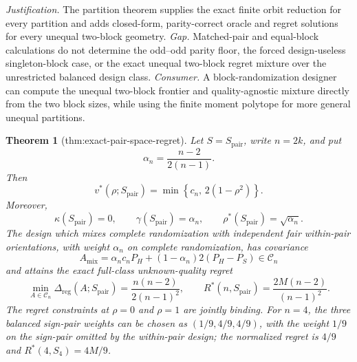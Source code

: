 \documentclass{article}
\newtheorem{theorem}{Theorem}
\begin{document}
\par\smallskip\noindent \textit{Justification.} The partition theorem supplies the exact finite orbit reduction for every partition and adds closed-form, parity-correct oracle and regret solutions for every unequal two-block geometry. \textit{Gap.} Matched-pair and equal-block calculations do not determine the odd--odd parity floor, the forced design-useless singleton-block case, or the exact unequal two-block regret mixture over the unrestricted balanced design class. \textit{Consumer.} A block-randomization designer can compute the unequal two-block frontier and quality-agnostic mixture directly from the two block sizes, while using the finite moment polytope for more general unequal partitions.

\begin{theorem}[thm:exact-pair-space-regret]\label{thm:exact-pair-space-regret}
Let \(S=S_{\mathrm{pair}}\), write \(n=2k\), and put
\[
 \alpha_n=\frac{n-2}{2(n-1)}.
\]
Then
\[
 v^*(\rho;S_{\mathrm{pair}})
 =\min\left\{c_n,\,2(1-\rho^2)\right\}.
\]
Moreover,
\[
 \kappa(S_{\mathrm{pair}})=0,
 \qquad
 \gamma(S_{\mathrm{pair}})=\alpha_n,
 \qquad
 \rho^*(S_{\mathrm{pair}})=\sqrt{\alpha_n}.
\]
The design which mixes complete randomization with independent fair within-pair orientations, with weight \(\alpha_n\) on complete randomization, has covariance
\[
 A_{\mathrm{mix}}
 =\alpha_n c_nP_H+(1-\alpha_n)2(P_H-P_S)\in\mathcal C_n
\]
and attains the exact full-class unknown-quality regret
\[
 \min_{A\in\mathcal C_n}\Delta_{\mathrm{reg}}(A;S_{\mathrm{pair}})
 =\frac{n(n-2)}{2(n-1)^2},
 \qquad
 R^*(n,S_{\mathrm{pair}})=\frac{2M(n-2)}{(n-1)^2}.
\]
The regret constraints at \(\rho=0\) and \(\rho=1\) are jointly binding.  For \(n=4\), the three balanced sign-pair weights can be chosen as \((1/9,4/9,4/9)\), with the weight \(1/9\) on the sign-pair omitted by the within-pair design; the normalized regret is \(4/9\) and \(R^*(4,S_4)=4M/9\).
\end{theorem}
\end{document}
